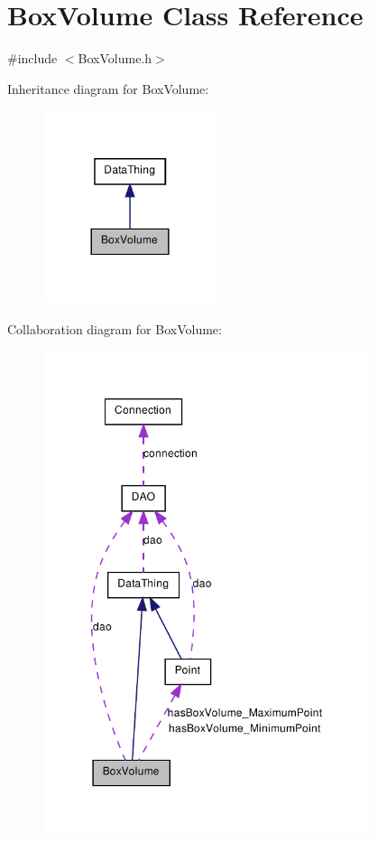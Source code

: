 \hypertarget{class_box_volume}{
\section{BoxVolume Class Reference}
\label{class_box_volume}
}


{\ttfamily \#include $<$BoxVolume.h$>$}



Inheritance diagram for BoxVolume:\nopagebreak
\begin{figure}[H]
\begin{center}
\leavevmode
\includegraphics[width=144pt]{class_box_volume__inherit__graph}
\end{center}
\end{figure}


Collaboration diagram for BoxVolume:\nopagebreak
\begin{figure}[H]
\begin{center}
\leavevmode
\includegraphics[width=272pt]{class_box_volume__coll__graph}
\end{center}
\end{figure}
